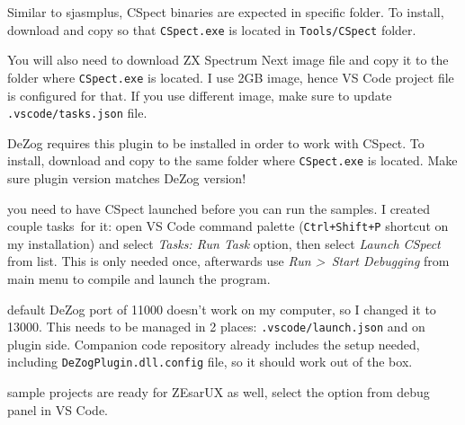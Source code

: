 \begin{description}[style=unboxed,leftmargin=0cm]
	Similar to sjasmplus, CSpect binaries are expected in specific folder. To install, download and copy so that {\tt CSpect.exe} is located in {\tt Tools/CSpect} folder.

	\item[CSpect Next Image (\url{http://www.zxspectrumnext.online/#sd})]\hfill

	You will also need to download ZX Spectrum Next image file and copy it to the folder where {\tt CSpect.exe} is located. I use 2GB image, hence VS Code project file is configured for that. If you use different image, make sure to update {\tt .vscode/tasks.json} file.
	
	\item[DeZog CSpect plugin (\url{https://github.com/maziac/DeZogPlugin})]\hfill

	DeZog requires this plugin to be installed in order to work with CSpect. To install, download and copy to the same folder where {\tt CSpect.exe} is located. Make sure plugin version matches DeZog version!

\end{description}

{
	\footnotesize

	\begin{description}[topsep=1pt,itemsep=1pt,labelindent=0pt,leftmargin=0pt]		
		\item[Note:] you need to have CSpect launched before you can run the samples. I created couple tasks\footnotemark~for it: open VS Code command palette ({\tt Ctrl+Shift+P} shortcut on my installation) and select \textit{Tasks: Run Task} option, then select \textit{Launch CSpect} from list. This is only needed once, afterwards use \textit{Run \textgreater ~Start Debugging} from main menu to compile and launch the program.

		\item[Note:] default DeZog port of 11000 doesn't work on my computer, so I changed it to 13000. This needs to be managed in 2 places: {\tt .vscode/launch.json} and on plugin side. Companion code repository already includes the setup needed, including {\tt DeZogPlugin.dll.config} file, so it should work out of the box.
	
		\item[Note:] sample projects are ready for ZEsarUX as well, select the option from debug panel in VS Code.
	\end{description}
}



